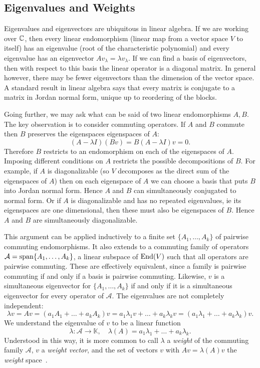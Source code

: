 \subsection{Eigenvalues and Weights}

Eigenvalues and eigenvectors are ubiquitous in linear algebra.
If we are working over $\mathbb{C}$, then every linear endomorphism (linear map from a vector space $V$ to itself) has an eigenvalue (root of the characteristic polynomial) and every eigenvalue has an eigenvector $Av_\lambda = \lambda v_\lambda$.
If we can find a basis of eigenvectors, then with respect to this basis the linear operator is a diagonal matrix.
In general however, there may be fewer eigenvectors than the dimension of the vector space.
A standard result in linear algebra says that every matrix is conjugate to a matrix in Jordan normal form, unique up to reordering of the blocks.

Going further, we may ask what can be said of two linear endomorphisms $A,B$.
The key observation is to consider commuting operators.
If $A$ and $B$ commute then $B$ preserves the eigenspaces  eigenspaces of $A$:
\[
(A- \lambda I) (Bv) 
= B(A- \lambda I) v
= 0.
\]
Therefore $B$ restricts to an endomorphism on each of the eigenspaces of $A$.
Imposing different conditions on $A$ restricts the possible decompositions of $B$.
For example, if $A$ is diagonalizable (so $V$ decomposes as the direct sum of the eigenspaces of $A$) then on each eigenspace of $A$ we can choose a basis that puts $B$ into Jordan normal form.
Hence $A$ and $B$ can simultaneously conjugated to normal form.
Or if $A$ is diagonalizable and has no repeated eigenvalues, ie its eigenspaces are one dimensional, then these must also be eigenspaces of $B$.
Hence $A$ and $B$ are simultaneously diagonalizable.

This argument can be applied inductively to a finite set $\{A_1,\dots,A_k\}$ of pairwise commuting endomorphisms.
It also extends to a commuting family of operators $\mathcal{A} = \operatorname{span}\{A_1,\dots,A_k\}$, a linear subspace of $\operatorname{End}(V)$ such that all operators are pairwise commuting.
These are effectively equivalent, since a family is pairwise commuting if and only if a basis is pairwise commuting.
Likewise, $v$ is a simultaneous eigenvector for $\{A_1,\dots,A_k\}$ if and only if it is a simultaneous eigenvector for every operator of $\mathcal{A}$.
The eigenvalues are not completely independent:
\[
\lambda v
= Av 
= (a_1A_1 + \dots + a_kA_k)v
= a_1 \lambda_1 v + \dots + a_k \lambda_k v
= (a_1 \lambda_1 + \dots + a_k \lambda_k )v.
\]
We understand the eigenvalue of $v$ to be a linear function 
\[
\lambda : \mathcal{A} \to \mathbb{K}, 
\quad
\lambda(A) = a_1 \lambda_1 + \dots + a_k \lambda_k .
\]
Understood in this way, it is more common to call $\lambda$ a \emph{weight} of the commuting family $\mathcal{A}$, $v$ a \emph{weight vector}, and the set of vectors $v$ with $Av = \lambda(A)v$ the \emph{weight} space~\cite[Definition~A.14]{Hall2015}.

